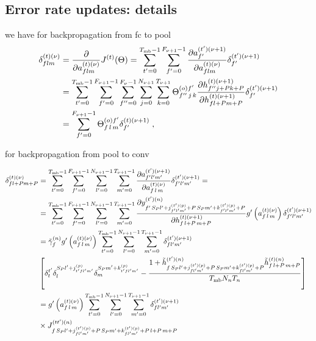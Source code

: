\begin{subappendices}
\section{Error rate updates: details} \label{sec:appenderrorrate}

we have for backpropagation from fc to pool
\begin{align}
\delta^{(t)(\nu)}_{flm}&= \frac{\partial }{\partial  a_{flm}^{(t)(\nu)}}J^{(t)}(\Theta)=
%
\sum_{t'=0}^{T_{{\rm mb}}-1}\sum_{f'=0}^{F_{\nu+1}-1}
%
 \frac{\partial  a_{f'}^{(t')(\nu+1)}}{\partial  a_{flm}^{(t)(\nu)}} \delta^{(t')(\nu+1)}_{f'}\notag\\
%
&=\sum_{t'=0}^{T_{{\rm mb}}-1}\sum_{f'=0}^{F_{\nu+1}-1}\sum^{F_\nu-1}_{f''=0}
%
\sum^{N_{\nu+1}}_{j=0}\sum^{T_{\nu+1}}_{k=0}\Theta^{(o)f'}_{f''\,j\,k}
%
\frac{\partial h^{(t)(\nu+1)}_{f''j+Pk+P} }{\partial  h_{fl+Pm+P}^{(t)(\nu+1)}} \delta^{(t')(\nu+1)}_{f'}\notag\\
%
&=\sum_{f'=0}^{F_{\nu+1}-1}\Theta^{(o)f'}_{f\,l\,m} \delta^{(t)(\nu+1)}_{f'}\;,
\end{align}

for backpropagation from pool to conv

\begin{align}
\delta^{(t)(\nu)}_{fl+Pm+P}&=
%
\sum_{t'=0}^{T_{{\rm mb}}-1}\sum^{F_{\nu+1}-1}_{f'=0}\sum^{N_{\nu+1}-1}_{l'=0}\sum^{T_{\nu+1}-1}_{m'=0}
%
\frac{\partial a_{f'l'm'}^{(t')(\nu+1)}}{\partial a_{f\,l\,m}^{(t)(\nu)}}
%
\delta_{f'l'm'}^{(t')(\nu+1)}
%
=\notag\\
%
&=\sum_{t'=0}^{T_{{\rm mb}}-1}\sum^{F_{\nu+1}-1}_{f'=0}\sum^{N_{\nu+1}-1}_{l'=0}\sum^{T_{\nu+1}-1}_{m'=0}
%
\frac{\partial y_{f'\,S_P l'+j_{f'l'm'}^{(t')(p)}+P\,S_Pm'+k_{f'l'm'}^{(t')(p)}+P}^{(t')(n)}}{\partial h_{f\,l+P\,m+P}^{(t)(\nu+1)}}
%
g'\left(a_{f\,l\,m}^{(t)(\nu)}\right)\delta_{f'l'm'}^{(t')(\nu+1)}\notag\\
%
&=\tilde{\gamma}^{(n)}_fg'\left(a_{f\,l\,m}^{(t)(\nu)}\right)
%
\sum_{t'=0}^{T_{{\rm mb}}-1}\sum^{N_{\nu+1}-1}_{l'=0}\sum^{T_{\nu+1}-1}_{m'=0}\delta_{fl'm'}^{(t')(\nu+1)}\notag\\
%
&\left[\delta^{t'}_t\delta^{S_P l'+j_{t'fl'm'}^{(p)}}_l\delta^{S_Pm'+k_{t'fl'm'}^{(p)}}_m-
%
\frac{1+\tilde{h}_{f\,S_P l'+j_{fl'm'}^{(t')(p)}+P\,S_Pm'+k_{fl'm'}^{(t')(p)}+P}^{(t')(n)}\tilde{h}_{f\,l+P\,m+P}^{(t)(n)}}{T_{{\rm mb}}N_{n}T_{n}}\right]\notag\\
%
&=g'\left(a_{f\,l\,m}^{(t)(\nu)}\right)\sum_{t'=0}^{T_{{\rm mb}}-1}\sum^{N_{\nu+1}-1}_{l'=0}
%
\sum^{T_{\nu+1}-1}_{m'=0}\delta_{fl'm'}^{(t')(\nu+1)}\notag\\
%
&\times J^{(tt')(n)}_{f\,S_P l'+j_{fl'm'}^{(t')(p)}+P\,S_Pm'+k_{fl'm'}^{(t')(p)}+P\,l+P\,m+P}
\end{align}


\end{subappendices}
